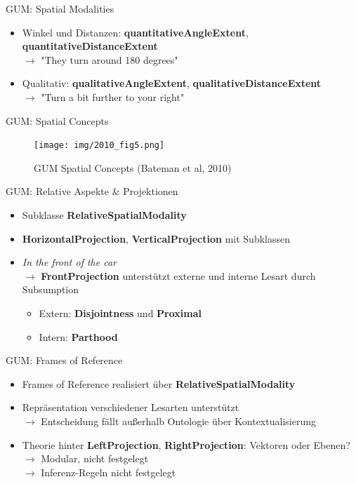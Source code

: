 \documentclass[12pt,a4paper]{beamer}
\begin{document}
\begin{frame}{GUM: Spatial Modalities}
\begin{itemize}
\item Winkel und Distanzen: \textbf{quantitativeAngleExtent}, \textbf{quantitativeDistanceExtent} \\
$\to$ "They turn around 180 degrees"
\item Qualitativ: \textbf{qualitativeAngleExtent}, \textbf{qualitativeDistanceExtent} \\
$\to$ "Turn a bit further to your right"
\end{itemize}
\end{frame}

\begin{frame}[plain]{GUM: Spatial Concepts}
\begin{figure}
\texttt{[image: img/2010\_fig5.png]}
\caption{GUM Spatial Concepts (Bateman et al, 2010)}
\end{figure}
\end{frame}



\begin{frame}{GUM: Relative Aspekte \& Projektionen}
\begin{itemize}
\item Subklasse \textbf{RelativeSpatialModality}
\item \textbf{HorizontalProjection}, \textbf{VerticalProjection} mit Subklassen
\item \textit{In the front of the car} \\
$\to$ \textbf{FrontProjection} unterstützt externe und interne Lesart durch Subsumption
\begin{itemize}
    \item Extern: \textbf{Disjointness} und \textbf{Proximal}
    \item Intern: \textbf{Parthood}
\end{itemize}
\end{itemize}
\end{frame}



\begin{frame}{GUM: Frames of Reference}
\begin{itemize}
\item Frames of Reference realisiert über \textbf{RelativeSpatialModality}
\item Repräsentation verschiedener Lesarten unterstützt \\
$\to$ Entscheidung fällt außerhalb Ontologie über Kontextualisierung
\item Theorie hinter \textbf{LeftProjection}, \textbf{RightProjection}: Vektoren oder Ebenen? \\
$\to$ Modular, nicht festgelegt \\
$\to$ Inferenz-Regeln nicht festgelegt
\end{itemize}
\end{frame}
\end{document}
